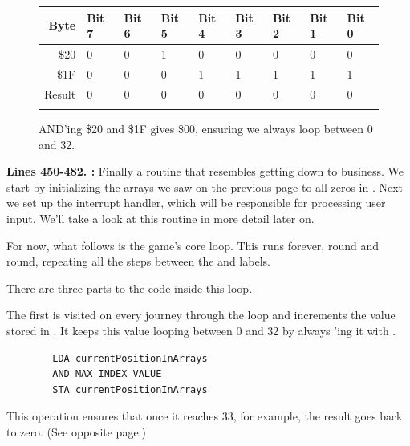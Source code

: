 \begin{figure}[H]
  {
    \setlength{\tabcolsep}{3.0pt}
    \setlength\cmidrulewidth{\heavyrulewidth} %
    \begin{adjustbox}{width=7cm,center}

      \begin{tabular}{rllllllll}
        \toprule
        Byte & Bit 7 & Bit 6 & Bit 5 & Bit 4 & Bit 3 & Bit 2 & Bit 1 & Bit 0        \\
        \midrule
        \$20 & 0 & 0 & 1 & 0 & 0 & 0 & 0 & 0 \\
        \$1F & 0 & 0 & 0 & 1 & 1 & 1 & 1 & 1 \\
        \midrule
        Result & 0 & 0 & 0 & 0 & 0 & 0 & 0 & 0 \\
        \addlinespace
        \bottomrule
      \end{tabular}
    \end{adjustbox}
    }\caption*{AND'ing \$20 and \$1F gives \$00, ensuring we always loop between 0 and 32.}
\end{figure}
\clearpage
{}
\textbf{Lines 450-482. :} Finally a routine that resembles getting down to business. We start by initializing the arrays we saw on the 
previous page to all zeros in . Next we set up the interrupt handler, which will
be responsible for processing user input. We'll take a look at this routine in more detail later on.

For now, what follows is the game's core loop. This runs forever, round and round, repeating all the steps between the
 and  labels. 

There are three parts to the code inside this loop. 

The first is visited on every journey through the loop and increments the
value stored in . It keeps this value looping between 0 and 32 by always 'ing
it with . 

\begin{lstlisting}
        LDA currentPositionInArrays
        AND MAX_INDEX_VALUE
        STA currentPositionInArrays
\end{lstlisting}

This  operation ensures that once it reaches 33, for example, the result
goes back to zero. (See opposite page.)

